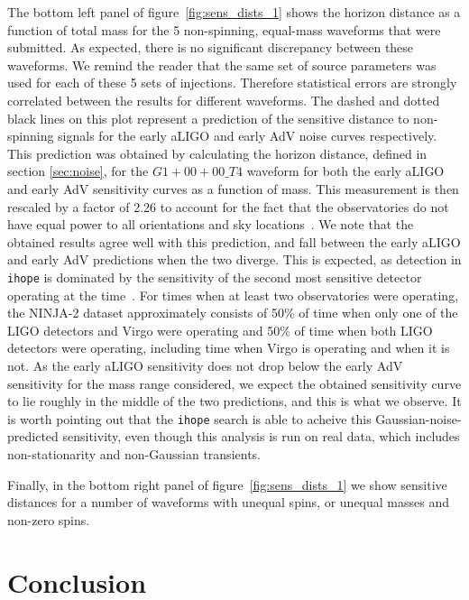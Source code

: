\documentclass[12pt]{iopart}
\newcommand{\ihope}{\texttt{ihope}}
\begin{document}
The bottom left panel of figure~\ref{fig:sens_dists_1} shows the
horizon distance as a function of total mass for the 5 non-spinning,
equal-mass waveforms that were submitted. As expected, there is no
significant discrepancy between these waveforms. We remind the reader that the 
same set of source parameters was used for each of these 5 sets of injections. 
Therefore statistical errors are strongly correlated between the results for
different waveforms. The dashed and dotted black lines on this plot represent 
a prediction of the sensitive distance to non-spinning signals for the 
early aLIGO and early AdV noise curves respectively. This prediction was 
obtained by calculating the horizon distance, defined in section 
\ref{sec:noise}, for the $G1+00+00\_T4$ waveform for both the early aLIGO and 
early AdV sensitivity curves as a function of mass. This measurement is then 
rescaled by a factor of 2.26 to account for the fact that the observatories do 
not have equal power to all orientations and sky locations~\cite{Finn:1992xs}. 
We note that the obtained results agree well with this prediction, and fall 
between the early aLIGO and early AdV predictions when the two diverge. This 
is expected, as detection in \ihope{} is dominated by the sensitivity of the 
second most sensitive detector operating at the time~\cite{Babak:2012zx}. For 
times when at least two observatories were operating, the NINJA-2 dataset 
approximately consists of 50\% of time when only one of the LIGO detectors and 
Virgo were operating and 50\% of time when both 
LIGO detectors were operating, including time when Virgo is operating and when 
it is not. As the early aLIGO sensitivity does not drop below the early AdV 
sensitivity for the mass range considered, we expect the obtained sensitivity 
curve to lie roughly in the middle of the two predictions, and this is what we 
observe. It is worth pointing out that the \ihope{} search is able to acheive 
this Gaussian-noise-predicted sensitivity, even though this analysis is run on 
real data, which includes non-stationarity and non-Gaussian transients.

Finally, in the bottom right panel of figure~\ref{fig:sens_dists_1} we show 
sensitive distances for a number of waveforms with unequal spins, or unequal 
masses and non-zero spins.

\section{Conclusion}
\label{sec:conclusions}
\end{document}
